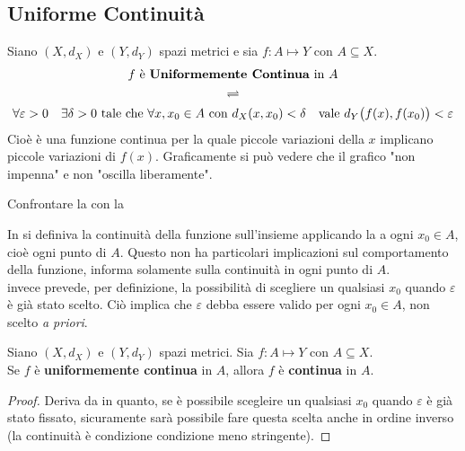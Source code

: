 \subsection{Uniforme Continuità}
\begin{definition}
	\label{def:funz_unif_cont}
	Siano $(X,d_X)$ e $(Y,d_Y)$ spazi metrici e sia $f:A \mapsto Y$ con $A \subseteq X$.
	\begin{equation*}
		\begin{gathered}
			f \text{ è \textbf{Uniformemente Continua} in } A\\
			\rightleftharpoons\\
			\forall \varepsilon > 0 \quad \exists \delta > 0 \text{ tale che } \forall x,x_0 \in A \text{ con } d_X(x,x_0) < \delta \quad \text{vale } d_Y\bigl(f(x),f(x_0)\bigr) < \varepsilon
		\end{gathered}
	\end{equation*}
	Cioè è una funzione continua per la quale piccole variazioni della $x$ implicano piccole variazioni di $f(x)$. Graficamente si può vedere che il grafico "non impenna" e non "oscilla liberamente".
\end{definition}
\begin{exercise}
	\label{ex:cont_unif_cont_comparision}
	Confrontare la  con la 
	\begin{solution}
		In  si definiva la continuità della funzione sull'insieme applicando la  a ogni $x_0 \in A$, cioè ogni punto di $A$. Questo non ha particolari implicazioni sul comportamento della funzione, informa solamente sulla continuità in ogni punto di $A$.\\
		 invece prevede, per definizione, la possibilità di scegliere un qualsiasi $x_0$ quando $\varepsilon$ è già stato scelto. Ciò implica che $\varepsilon$ debba essere valido per ogni $x_0 \in A$, non scelto \textit{a priori}.
	\end{solution}
\end{exercise}
\begin{proposition}
	\label{prop:if_unif_cont_then_conf}
	Siano $(X,d_X)$ e $(Y,d_Y)$ spazi metrici. Sia $f:A \mapsto Y$ con $A \subseteq X$.\\
	Se $f$ è \textbf{uniformemente continua} in $A$, allora $f$ è \textbf{continua} in $A$.
	\begin{proof}
		Deriva da  in quanto, se è possibile scegleire un qualsiasi $x_0$ quando $\varepsilon$ è già stato fissato, sicuramente sarà possibile fare questa scelta anche in ordine inverso (la continuità è condizione condizione meno stringente).
	\end{proof}
\end{proposition}
